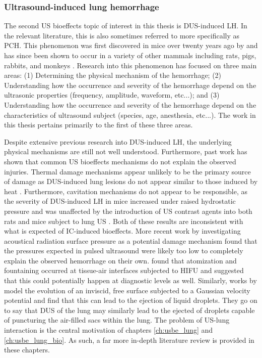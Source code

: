 \subsubsection{Ultrasound-induced lung hemorrhage}
The second \ac{US} bioeffects topic of interest in this thesis is
\ac{DUS}-induced \ac{LH}. In the relevant literature, this is also
sometimes referred to more specifically as \ac{PCH}. This phenomenon
was first discovered in mice over twenty years ago by \cite{Child1990}
and has since been shown to occur in a variety of other mammals
including rats, pigs, rabbits, and monkeys \citep{OBrien1997a,
  Miller2012, Tarantal1994a}. Research into this phenomenon has
focused on three main areas: (1) Determining the physical mechanism of
the hemorrhage; (2) Understanding how the occurrence and severity of
the hemorrhage depend on the ultrasonic properties (frequency,
amplitude, waveform, etc...); and (3) Understanding how the occurrence
and severity of the hemorrhage depend on the characteristics of
ultrasound subject (species, age, anesthesia, etc...). The work in
this thesis pertains primarily to the first of these three areas.

Despite extensive previous research into \ac{DUS}-induced \ac{LH}, the
underlying physical mechanisms are still not well
understood. Furthermore, past work has shown that common \ac{US}
bioeffects mechanisms do not explain the observed injuries. Thermal
damage mechanisms appear unlikely to be the primary source of damage
as \ac{DUS}-induced lung lesions do not appear similar to those
induced by heat \citep{Zachary2006}. Furthermore, cavitation
mechanisms do not appear to be responsible, as the severity of
\ac{DUS}-induced \ac{LH} in mice increased under raised hydrostatic
pressure \citep{OBrien2000} and was unaffected by the introduction of
\ac{US} contrast agents into both rats and mice subject to lung \ac{US}
\citep{Raeman1997,OBrien2004}. Both of these results are inconsistent
with what is expected of \ac{IC}-induced bioeffects. More recent work
by \cite{Miller2016a,Miller2016} investigating acoustical radiation surface
pressure as a potential damage mechanism found that the pressures
expected in pulsed ultrasound were likely too low to completely
explain the observed hemorrhage on their own. \cite{Simon2012} found
that atomization and fountaining occurred at tissue-air interfaces
subjected to \ac{HIFU} and suggested that this could potentially
happen at diagnostic levels as well. Similarly, works by
\cite{Tjan2007,Tjan2008} model the evolution of an inviscid, free
surface subjected to a Gaussian velocity potential and find that this
can lead to the ejection of liquid droplets. They go on to say that
\ac{DUS} of the lung may similarly lead to the ejected of droplets
capable of puncturing the air-filled sacs within the lung. The problem
of \ac{US}-lung interaction is the central motivation of chapters
\ref{ch:usbe_lung} and \ref{ch:usbe_lung_bio}. As such, a far more
in-depth literature review is provided in these chapters.

